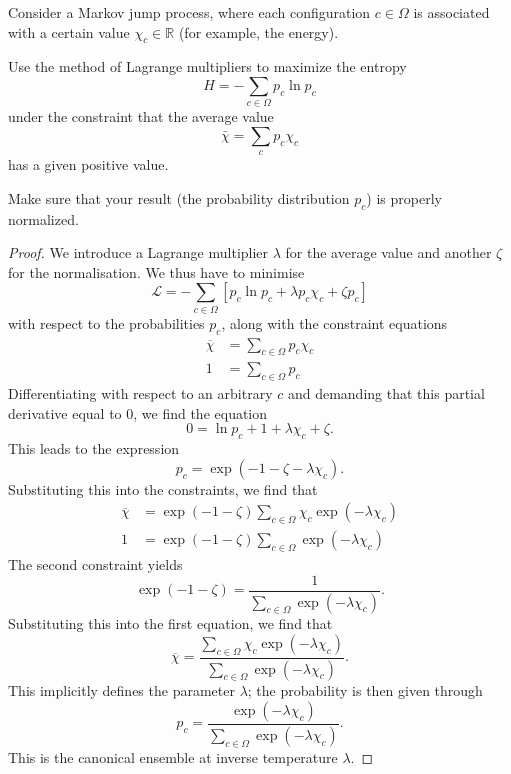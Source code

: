 \begin{Problem}
Consider a Markov jump process, where each configuration
\(c\in\Omega\) is associated with a certain value
\(\chi_c\in\mathbb{R}\) (for example, the energy).

Use the method of Lagrange multipliers to maximize the entropy
\[
H=-\sum_{c\in\Omega} p_c \ln p_c
\]
under the constraint that the average value
\[
\bar{\chi}
=
\sum_c p_c \chi_c
\]
has a given positive value.

Make sure that your result (the probability distribution \(p_c\))
is properly normalized.
\end{Problem}
\begin{proof}
	We introduce a Lagrange multiplier $\lambda$ for the average value and another $\zeta$ for the normalisation. We thus have to minimise
	\[
		\mathcal{L}=- \sum_{c\in\Omega} [p_c \ln p_c +\lambda p_c \chi_c + \zeta p_c]
	\] 
	with respect to the probabilities $p_c$, along with the constraint equations
	\begin{align*}
		\overline{\chi}&= \sum_{c\in\Omega} p_c \chi_c \\
		1 &= \sum_{c\in \Omega} p_c 
	\end{align*}
	Differentiating with respect to an arbitrary $c$ and demanding that this partial derivative equal to 0, we find the equation
	\[
	0 = \ln p_c + 1 + \lambda \chi_c + \zeta
	.\] 
	This leads to the expression
	\[
	p_c = \exp(-1 - \zeta - \lambda\chi_c)
	.\] 
	Substituting this into the constraints, we find that
	\begin{align*}
		\overline{\chi} &= \exp(-1-\zeta)\sum_{c\in \Omega}\chi_c\exp(-\lambda\chi_c) \\
		1 &= \exp(-1-\zeta) \sum_{c\in\Omega} \exp(-\lambda\chi_c) 
	\end{align*}
	The second constraint yields
	\[
		\exp(-1-\zeta) = \frac{1}{\sum_{c\in\Omega} \exp(-\lambda\chi_c)}
	.\] 
	Substituting this into the first equation, we find that
	\[
		\overline{\chi}= \frac{\sum_{c\in \Omega}\chi_c \exp(-\lambda\chi_c)}{\sum_{c\in \Omega}\exp(-\lambda \chi_c)}
	.\] 
	This implicitly defines the parameter $\lambda$; the probability is then given through
	\[
		p_c = \frac{\exp(-\lambda\chi_c)}{\sum_{c\in \Omega} \exp(-\lambda \chi_c)}
	.\] 
	This is the canonical ensemble at inverse temperature $\lambda$.
\end{proof}
